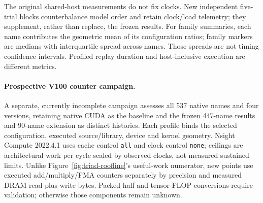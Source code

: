 The original shared-host measurements do not fix clocks. New independent five-trial blocks counterbalance model order and retain clock/load telemetry; they supplement, rather than replace, the frozen results. For family summaries, each name contributes the geometric mean of its configuration ratios; family markers are medians with interquartile spread across names. Those spreads are not timing confidence intervals. Profiled replay duration and host-inclusive execution are different metrics.

\paragraph{Prospective V100 counter campaign.}
A separate, currently incomplete campaign assesses all 537 native names and four
versions, retaining native CUDA as the baseline and the frozen 447-name results
and 90-name extension as distinct histories. Each profile binds the selected
configuration, executed source/library, device and kernel geometry. Nsight Compute
2022.4.1 uses cache control \texttt{all} and clock control \texttt{none}; ceilings
are architectural work per cycle scaled by observed clocks, not measured sustained
limits. Unlike Figure~\ref{fig:triad-roofline}'s useful-work numerator, new points
use executed add/multiply/FMA counters separately by precision and measured DRAM
read-plus-write bytes. Packed-half and tensor FLOP conversions require validation;
otherwise those components remain unknown.
